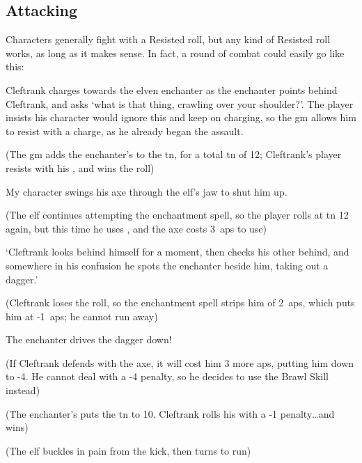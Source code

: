 \begin{multicols}{2}

\subsection{Attacking}
\label{attack}

Characters generally fight with a Resisted  roll, but any kind of Resisted roll works, as long as it makes sense.
In fact, a round of combat could easily go like this:

\begin{exampletext}
  Cleftrank charges towards the elven enchanter as the enchanter points behind Cleftrank, and asks `what is that thing, crawling over your shoulder?'.
  The player insists his character would ignore this and keep on charging, so the \gls{gm} allows him to resist with a charge, as he already began the assault.

  \small{(The \gls{gm} adds the enchanter's  to the \gls{tn}, for a total \gls{tn} of 12; Cleftrank's player resists with his , and wins the roll)}

  My character swings his axe through the elf's jaw to shut him up.

  \small{(The elf continues attempting the enchantment spell, so the player rolls at \gls{tn} 12 again, but this time he uses , and the axe costs 3~\glspl{ap} to use)}

  `Cleftrank looks behind himself for a moment, then checks his other behind, and somewhere in his confusion he spots the enchanter beside him, taking out a dagger.'

  \small{(Cleftrank loses the roll, so the enchantment spell strips him of 2~\glspl{ap}, which puts him at -1~\glspl{ap}; he cannot run away)}

  The enchanter drives the dagger down!

  \small{(If Cleftrank defends with the axe, it will cost him 3 more \glspl{ap}, putting him down to -4.
  He cannot deal with a -4 penalty, so he decides to use the Brawl Skill instead)}

  (The enchanter's  puts the \gls{tn} to 10.
  Cleftrank rolls his  with a -1 penalty\ldots and wins)

  \small{(The elf buckles in pain from the kick, then turns to run)}

\end{exampletext}


\end{multicols}
